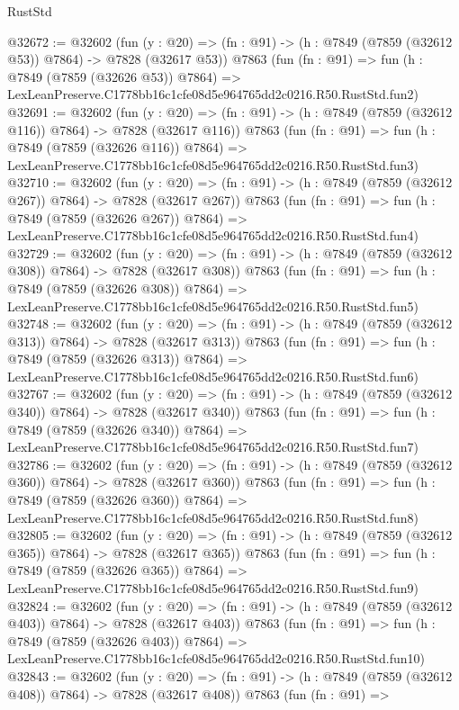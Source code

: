 \begin{lexlean}{RustStd}
\begin{coremodule}
@32672 := @32602
    (fun (y : @20) => (fn : @91) -> (h : @7849 (@7859 (@32612 @53)) @7864) -> @7828 (@32617 @53))
    @7863
    (fun (fn : @91) =>
    fun (h : @7849 (@7859 (@32626 @53)) @7864) =>
    LexLeanPreserve.C1778bb16c1cfe08d5e964765dd2c0216.R50.RustStd.fun2)
@32691 := @32602
    (fun (y : @20) => (fn : @91) -> (h : @7849 (@7859 (@32612 @116)) @7864) -> @7828 (@32617 @116))
    @7863
    (fun (fn : @91) =>
    fun (h : @7849 (@7859 (@32626 @116)) @7864) =>
    LexLeanPreserve.C1778bb16c1cfe08d5e964765dd2c0216.R50.RustStd.fun3)
@32710 := @32602
    (fun (y : @20) => (fn : @91) -> (h : @7849 (@7859 (@32612 @267)) @7864) -> @7828 (@32617 @267))
    @7863
    (fun (fn : @91) =>
    fun (h : @7849 (@7859 (@32626 @267)) @7864) =>
    LexLeanPreserve.C1778bb16c1cfe08d5e964765dd2c0216.R50.RustStd.fun4)
@32729 := @32602
    (fun (y : @20) => (fn : @91) -> (h : @7849 (@7859 (@32612 @308)) @7864) -> @7828 (@32617 @308))
    @7863
    (fun (fn : @91) =>
    fun (h : @7849 (@7859 (@32626 @308)) @7864) =>
    LexLeanPreserve.C1778bb16c1cfe08d5e964765dd2c0216.R50.RustStd.fun5)
@32748 := @32602
    (fun (y : @20) => (fn : @91) -> (h : @7849 (@7859 (@32612 @313)) @7864) -> @7828 (@32617 @313))
    @7863
    (fun (fn : @91) =>
    fun (h : @7849 (@7859 (@32626 @313)) @7864) =>
    LexLeanPreserve.C1778bb16c1cfe08d5e964765dd2c0216.R50.RustStd.fun6)
@32767 := @32602
    (fun (y : @20) => (fn : @91) -> (h : @7849 (@7859 (@32612 @340)) @7864) -> @7828 (@32617 @340))
    @7863
    (fun (fn : @91) =>
    fun (h : @7849 (@7859 (@32626 @340)) @7864) =>
    LexLeanPreserve.C1778bb16c1cfe08d5e964765dd2c0216.R50.RustStd.fun7)
@32786 := @32602
    (fun (y : @20) => (fn : @91) -> (h : @7849 (@7859 (@32612 @360)) @7864) -> @7828 (@32617 @360))
    @7863
    (fun (fn : @91) =>
    fun (h : @7849 (@7859 (@32626 @360)) @7864) =>
    LexLeanPreserve.C1778bb16c1cfe08d5e964765dd2c0216.R50.RustStd.fun8)
@32805 := @32602
    (fun (y : @20) => (fn : @91) -> (h : @7849 (@7859 (@32612 @365)) @7864) -> @7828 (@32617 @365))
    @7863
    (fun (fn : @91) =>
    fun (h : @7849 (@7859 (@32626 @365)) @7864) =>
    LexLeanPreserve.C1778bb16c1cfe08d5e964765dd2c0216.R50.RustStd.fun9)
@32824 := @32602
    (fun (y : @20) => (fn : @91) -> (h : @7849 (@7859 (@32612 @403)) @7864) -> @7828 (@32617 @403))
    @7863
    (fun (fn : @91) =>
    fun (h : @7849 (@7859 (@32626 @403)) @7864) =>
    LexLeanPreserve.C1778bb16c1cfe08d5e964765dd2c0216.R50.RustStd.fun10)
@32843 := @32602
    (fun (y : @20) => (fn : @91) -> (h : @7849 (@7859 (@32612 @408)) @7864) -> @7828 (@32617 @408))
    @7863
    (fun (fn : @91) =>

\end{coremodule}
\end{lexlean}
